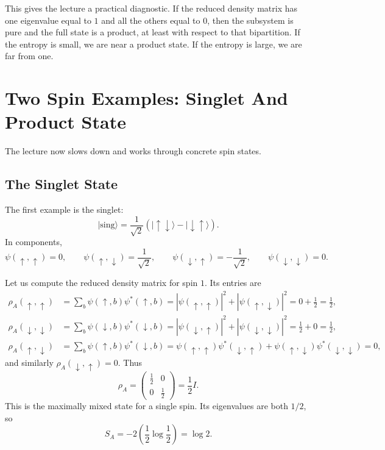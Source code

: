 This gives the lecture a practical diagnostic. If the reduced density matrix has one eigenvalue equal to \(1\) and all the others equal to \(0\), then the subsystem is pure and the full state is a product, at least with respect to that bipartition. If the entropy is small, we are near a product state. If the entropy is large, we are far from one.

\section{Two Spin Examples: Singlet And Product State}

The lecture now slows down and works through concrete spin states.

\subsection{The Singlet State}

The first example is the singlet:
\begin{equation}
|\mathrm{sing}\rangle
=
\frac{1}{\sqrt{2}}
\left(
|\uparrow\downarrow\rangle
-
|\downarrow\uparrow\rangle
\right).
\end{equation}
In components,
\begin{equation}
\psi(\uparrow,\uparrow)=0,\qquad
\psi(\uparrow,\downarrow)=\frac{1}{\sqrt2},\qquad
\psi(\downarrow,\uparrow)=-\frac{1}{\sqrt2},\qquad
\psi(\downarrow,\downarrow)=0.
\end{equation}

Let us compute the reduced density matrix for spin \(1\). Its entries are
\begin{align}
\rho_A(\uparrow,\uparrow)
&=
\sum_b \psi(\uparrow,b)\psi^*(\uparrow,b)
=
|\psi(\uparrow,\uparrow)|^2 + |\psi(\uparrow,\downarrow)|^2
=
0+\frac12
=
\frac12,
\\
\rho_A(\downarrow,\downarrow)
&=
\sum_b \psi(\downarrow,b)\psi^*(\downarrow,b)
=
|\psi(\downarrow,\uparrow)|^2 + |\psi(\downarrow,\downarrow)|^2
=
\frac12 + 0
=
\frac12,
\\
\rho_A(\uparrow,\downarrow)
&=
\sum_b \psi(\uparrow,b)\psi^*(\downarrow,b)
=
\psi(\uparrow,\uparrow)\psi^*(\downarrow,\uparrow)
+
\psi(\uparrow,\downarrow)\psi^*(\downarrow,\downarrow)
=
0,
\end{align}
and similarly \(\rho_A(\downarrow,\uparrow)=0\). Thus
\begin{equation}
\rho_A
=
\begin{pmatrix}
\frac12 & 0 \\[4pt]
0 & \frac12
\end{pmatrix}
=
\frac12 I.
\end{equation}
This is the maximally mixed state for a single spin. Its eigenvalues are both \(1/2\), so
\begin{equation}
S_A = -2\left(\frac12\log\frac12\right)=\log 2.
\end{equation}

